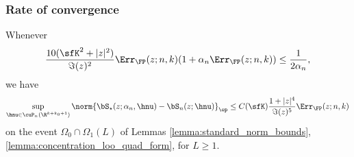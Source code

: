 \subsubsection{Rate of convergence}

\begin{lemma}
\label{lemma:rate_matrix_ST}
Whenever
\begin{equation}
\label{eq:n_n_0_2}
     \frac{10(\sfK^2 + |z|^2)}{\Im(z)^2}\Err_{\FP}(z;n,k)(1 + \alpha_n\Err_{\FP}(z;n,k))  \le  \frac1{2\alpha_n},
 \end{equation}
we have 
\begin{equation}
\nonumber
    \sup_{\hnu \in\cuP_n(\R^{k+k_0+1})}\norm{\bS_\star(z;\alpha_n, \hnu) -\bS_n(z;\hnu)}_\op \le C(\sfK)
    \frac{1 + |z|^4}{\Im(z)^5} 
\Err_{\FP}(z; n, k)
\end{equation}
on the event $\Omega_0 \cap\Omega_1(L)$ of Lemmas \ref{lemma:standard_norm_bounds},
\ref{lemma:concentration_loo_quad_form}, for $L\ge 1$.
\end{lemma}

